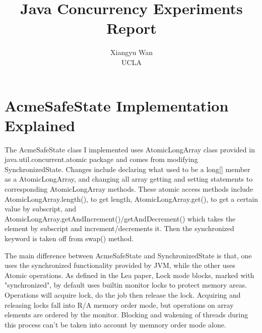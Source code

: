 \documentclass[letterpaper,twocolumn,10pt]{article}
\begin{document}

\date{}

\title{\Large \bf Java Concurrency Experiments Report}

\author{
{\rm Xiangyu Wan}\\
UCLA
} %

\maketitle


\section{AcmeSafeState Implementation Explained}

The AcmeSafeState class I implemented uses AtomicLongArray class provided in java.util.concurrent.atomic package and comes from modifying SynchronizedState. 
Changes include declaring what used to be a long[] member as a AtomicLongArray, and changing all array getting and setting statements to corresponding AtomicLongArray methods.
These atomic access methods include AtomicLongArray.length(), to get length, AtomicLongArray.get(), to get a certain value by subscript, and AtomicLongArray.getAndIncrement()/getAndDecrement() which takes the element by subscript and increment/decrements it.
Then the synchronized keyword is taken off from swap() method.

The main difference between AcmeSafeState and SynchronizedState is that, one uses the synchronized functionality provided by JVM, while the other uses Atomic operations.
As defined in the Lea paper, Lock mode blocks, marked with "synchronized", by default uses builtin monitor locks to protect memory areas.
Operations will acquire lock, do the job then release the lock.
Acquiring and releasing locks fall into R/A memory order mode, 
but operations on array elements are ordered by the monitor.
Blocking and wakening of threads during this process can't be taken into account by memnory order mode alone.
\end{document}
